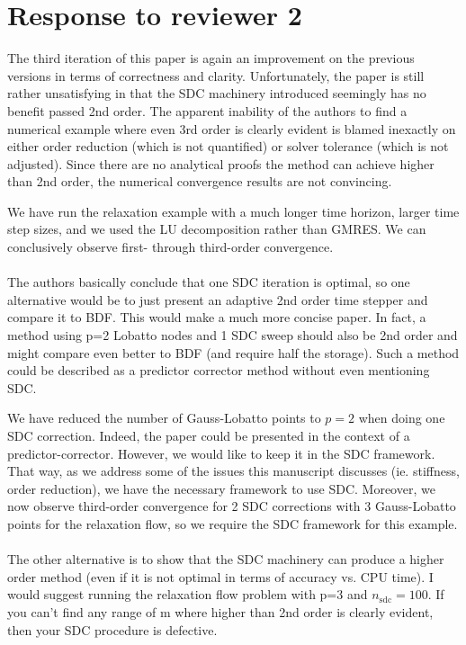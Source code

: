 \documentclass[12pt]{article}
\newcommand{\comment}[1]{{\color{blue} #1}}
\newcommand{\sdc}{{\mathrm{sdc}}}
\begin{document}
\section*{Response to reviewer 2}
\comment{The third iteration of this paper is again an improvement on
the previous versions in terms of correctness and clarity.
Unfortunately, the paper is still rather unsatisfying in that the SDC
machinery introduced seemingly has no benefit passed 2nd order.  The
apparent inability of the authors to find a numerical example where even
3rd order is clearly evident is blamed inexactly on either order
reduction (which is not quantified) or solver tolerance (which is not
adjusted).  Since there are no analytical proofs the method can achieve
higher than 2nd order, the numerical convergence results are not
convincing.}

We have run the relaxation example with a much longer time horizon,
larger time step sizes, and we used the LU decomposition rather than
GMRES.  We can conclusively observe first- through third-order
convergence.\\ \\
\comment{The authors basically conclude that one SDC iteration is
optimal, so one alternative would be to just present an adaptive 2nd
order time stepper and compare it to BDF.  This would make a much more
concise paper.  In fact, a method using p=2 Lobatto nodes and 1 SDC
sweep should also be 2nd order and might compare even better to BDF (and
require half the storage).  Such a method could be described as a
predictor corrector method without even mentioning SDC.}

We have reduced the number of Gauss-Lobatto points to $p=2$ when doing
one SDC correction.  Indeed, the paper could be presented in the context
of a predictor-corrector.  However, we would like to keep it in the SDC
framework.  That way, as we address some of the issues this manuscript
discusses (ie. stiffness, order reduction), we have the necessary
framework to use SDC.  Moreover, we now observe third-order convergence
for 2 SDC corrections with 3 Gauss-Lobatto points for the relaxation
flow, so we require the SDC framework for this example. \\ \\
\comment{The other alternative is to show that the SDC machinery can
produce a higher order method (even if it is not optimal in terms of
accuracy vs. CPU time).  I would suggest running the relaxation flow
problem with p=3 and $n_{\sdc}=100$.  If you can't find any range of m
where higher than 2nd order is clearly evident, then your SDC procedure
is defective.}
\end{document}
